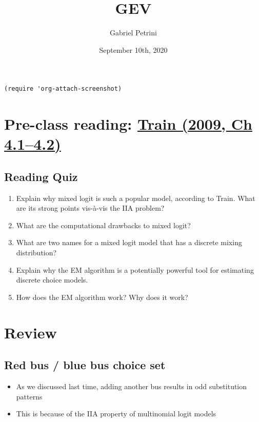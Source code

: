 \documentclass[11pt]{article}
\author{Gabriel Petrini}
\date{September 10th, 2020}
\title{GEV}
\begin{document}
\maketitle
\tableofcontents

\begin{verbatim}
(require 'org-attach-screenshot)
\end{verbatim}

\section{Pre-class reading: \href{http://eml.berkeley.edu/books/choice2nd/Ch04\_p76-96.pdf}{Train (2009, Ch 4.1--4.2)}}
\label{sec:org3efee05}

\subsection{Reading Quiz}
\label{sec:orgb43ff4e}
\begin{enumerate}
\item Explain why mixed logit is such a popular model, according to Train. What are its strong points vis-à-vis the IIA problem?
\item What are the computational drawbacks to mixed logit?
\item What are two names for a mixed logit model that has a discrete mixing distribution?
\item Explain why the EM algorithm is a potentially powerful tool for estimating discrete choice models.
\item How does the EM algorithm work? Why does it work?
\end{enumerate}


\section{Review}
\label{sec:org1abb5eb}

\subsection{Red bus / blue bus choice set}
\label{sec:orgbc05bb7}

\begin{itemize}
\item As we discussed last time, adding another bus results in odd substitution patterns
\item This is because of the IIA property of multinomial logit models
\end{itemize}
\end{document}
